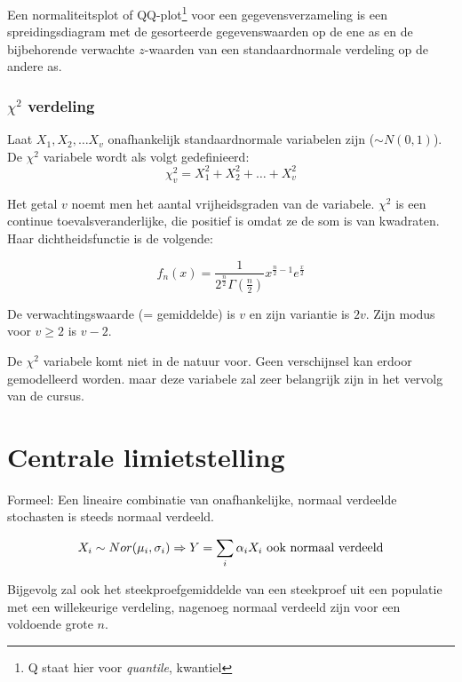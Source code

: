 {\begin{definition}
  \label{def:qq-plot}
  Een normaliteitsplot of QQ-plot\footnote{Q staat hier voor \emph{quantile}, kwantiel} voor een gegevens\-verzameling is een spreidingsdiagram met de gesorteerde gegevenswaarden op de ene as en de bijbehorende verwachte $z$-waarden van een standaardnormale verdeling op de andere as.
\end{definition}




\subsubsection{$\chi^{2}$ verdeling}
Laat $X_{1}, X_{2}, \dots X_{v}$ onafhankelijk standaardnormale variabelen zijn ($\sim N(0,1)$). De $\chi^{2}$ variabele wordt als volgt gedefinieerd:
\[ \chi^{2}_{v} = X_{1}^{2} + X_{2}^{2} + \dots + X_{v}^{2} \]

Het getal $v$ noemt men het aantal vrijheidsgraden van de variabele. $\chi^{2}$ is een continue toevalsveranderlijke, die positief is omdat ze de som is van kwadraten. Haar dichtheidsfunctie is de volgende:

\[ f_{n}(x) = \frac{1}{2^{\frac{n}{2}}\Gamma(\frac{n}{2})} x^{\frac{n}{2} -1} e^{\frac{x}{2}} \]

De verwachtingswaarde (= gemiddelde) is $v$ en zijn variantie is $2v$. Zijn modus voor $v \geq 2$ is $v-2$.

De $\chi^{2}$ variabele komt niet in de natuur voor. Geen verschijnsel kan erdoor gemodelleerd worden. maar deze variabele zal zeer belangrijk zijn in het vervolg van de cursus.

\section{Centrale limietstelling}
\label{sec:centrale-limietstelling}

\begin{definition}
Formeel: Een lineaire combinatie van onafhankelijke, normaal verdeelde stochasten is steeds normaal verdeeld.

\[X_{i} \sim Nor(\mu_{i}, \sigma_{i}) \Rightarrow Y = \sum_{i} \alpha_{i} X_{i} \textnormal{ ook normaal verdeeld} \]

Bijgevolg zal ook het steekproefgemiddelde van een steekproef uit een populatie met een willekeurige verdeling, nagenoeg normaal verdeeld zijn voor een voldoende grote $n$.
\end{definition}

}
